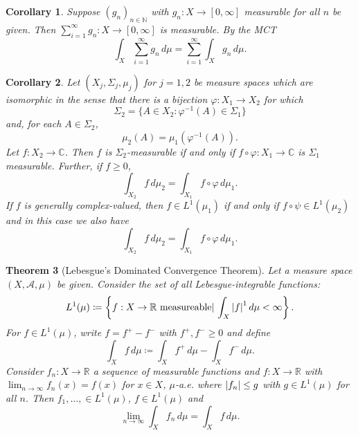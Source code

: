 \documentclass[11pt, letter]{book}
\newtheorem{theorem}{Theorem}[section]
\newtheorem{corollary}[theorem]{Corollary}
\begin{document}
\begin{corollary}
Suppose $(g_n)_{n\in \mathbb{N}}$ with $g_n : X \to [0,\infty]$ measurable for all $n$ be given. Then  $\sum^\infty_{i=1}g_n : X \to [0, \infty]$ is measurable. By the MCT
\begin{equation*}
    \int_X \sum^\infty_{i=1} g_n \,d\mu = \sum^\infty_{i=1} \int_X g_n \,d\mu.
\end{equation*}
\end{corollary}


\begin{corollary}
Let $(X_j,\Sigma_j,\mu_j)$ for $j=1,2$ be measure spaces which are isomorphic in the sense that there is a bijection $\varphi:X_1\to X_2$ for which
\begin{equation*}
\Sigma_2=\{A\in X_2:\varphi^{-1}(A)\in\Sigma_1\}
\end{equation*}
and, for each $A\in\Sigma_2$,
\begin{equation*}
\mu_2(A)=\mu_1(\varphi^{-1}(A)).
\end{equation*}
Let $f:X_2\to\mathbb{C}$. Then $f$ is $\Sigma_2$-measurable if and only if $f\circ \varphi:X_1\to\mathbb{C}$ is $\Sigma_1$ measurable. Further, if $f\geq 0$,
\begin{equation*}
\int_{X_2}f\,d\mu_2=\int_{X_1}f\circ \varphi\,d\mu_1.
\end{equation*}
If $f$ is generally complex-valued, then $f\in L^1(\mu_1)$ if and only if $f\circ \psi\in L^1(\mu_2)$ and in this case we also have
\begin{equation*}
\int_{X_2}f\,d\mu_2=\int_{X_1}f\circ \varphi\,d\mu_1.
\end{equation*}
\end{corollary}

\begin{theorem}[Lebesgue's Dominated Convergence Theorem]
Let a measure space $(X,\mathcal{A},\mu)$ be given. Consider the set of all Lebesgue-integrable functions:
\begin{equation*}
    L^1(\mu) \coloneqq \left\{ f: X \to \mathbb{R} \text{ measureable}\vert \, \int_X \abs{f}^1\,d\mu < \infty \right\}.
\end{equation*}
For $f\in L^{1}(\mu)$, write $f = f^+ - f^-$ with $f^+,f^- \geq 0$ and define
\begin{equation*}
    \int_X f\,d\mu \coloneqq \int_X f^+ \,d\mu - \int_X f^- \,d\mu.
\end{equation*}
Consider $f_n : X \to \mathbb{R}$ a sequence of measurable functions and $f : X \to \mathbb{R}$ with $\lim_{n\to \infty} f_n(x) = f(x)$ for $x\in X$, $\mu$-a.e. where $\abs{f_n} \leq g$ with $g\in L^1(\mu)$ for all $n$. Then $f_1, \dots, \in L^{1}(\mu)$, $f\in L^{1}(\mu)$ and 
\begin{equation*}
    \lim_{n\to \infty} \int_X f_n\,d\mu = \int_X f\,d\mu.
\end{equation*}
\end{theorem}
\end{document}
